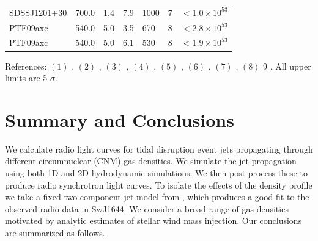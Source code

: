 \documentclass[usenatbib,fleqn]{mnras}
\begin{document}
\begin{table}
\begin{threeparttable}
\begin{tabular*}{1.5\columnwidth}{lllllll}
SDSSJ1201+30 & 700.0 & 1.4 & 7.9 & 1000 & 7 & $< 1.0 \times 10^{ 53 }$ \\
PTF09axc & 540.0 & 5.0 & 3.5 & 670 & 8 & $< 2.8 \times 10^{ 53 }$ \\
PTF09axc & 540.0 & 5.0 & 6.1 & 530 & 8 & $< 1.9 \times 10^{ 53 }$ \\
\end{tabular*}
\begin{tablenotes}
\item References: $(1)$ \citet{Bower+2013}, $(2)$ \citet{van-Velzen+2013},
$(3)$ \citet{Bade+1996, Komossa2002},
$(4)$ \citet{Gezari+2008,Bower+2011}, $(5)$ \citet{van-Velzen+2011},
$(6)$ \citet{Drake+2011}, $(7)$ \citet{Saxton+2012}, $(8)$
\citet{Arcavi+2014} $9$ \citet{Cenko+2012}. All upper limits are 5 $\sigma$.
\end{tablenotes}
\end{threeparttable}
\end{table}

\section{Summary and Conclusions}
\label{sec:conc}

We calculate radio light curves for tidal disruption event jets
propagating through different circumnuclear (CNM) gas densities. We
simulate the jet propagation using both 1D and 2D hydrodynamic
simulations. We then post-process these to produce radio synchrotron
light curves. To isolate the effects of the density profile we take a
fixed two component jet model from \citet{Mimica+2015}, which produces
a good fit to the observed radio data in SwJ1644. We
consider a broad range of gas densities motivated by analytic
estimates of stellar wind mass injection. Our conclusions
are summarized as follows.
\end{document}
